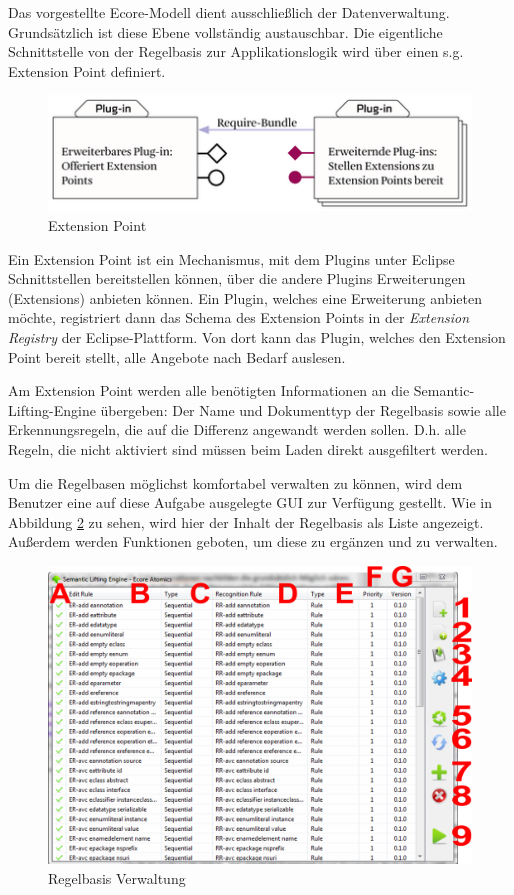 Das vorgestellte Ecore-Modell dient ausschließlich der Datenverwaltung. Grundsätzlich ist diese
Ebene vollständig austauschbar. Die eigentliche Schnittstelle von der Regelbasis zur
Applikationslogik wird über einen s.g. Extension Point definiert.

\begin{figure}[htb]
  \centering \includegraphics[scale=0.8]{images/extension_point.png}
  \caption{Extension Point \cite{ERCP2011}}
  \label{fig:extension_point}
\end{figure}

Ein Extension Point ist ein Mechanismus, mit dem Plugins unter Eclipse Schnittstellen bereitstellen
können, über die andere Plugins Erweiterungen (Extensions) anbieten können. Ein Plugin, welches eine
Erweiterung anbieten möchte, registriert dann das Schema des Extension Points in der
\textit{Extension Registry} der Eclipse-Plattform. Von dort kann das Plugin, welches den Extension
Point bereit stellt, alle Angebote nach Bedarf auslesen. \cite{ERCP2011}

Am Extension Point werden alle benötigten Informationen an die Semantic-Lifting-Engine übergeben:
Der Name und Dokumenttyp der Regelbasis sowie alle Erkennungsregeln, die auf die Differenz angewandt
werden sollen. D.h. alle Regeln, die nicht aktiviert sind müssen beim Laden direkt ausgefiltert
werden.

Um die Regelbasen möglichst komfortabel verwalten zu können, wird dem Benutzer eine auf diese
Aufgabe ausgelegte GUI zur Verfügung gestellt. Wie in Abbildung \ref{fig:rulbase_gui} zu sehen,
wird hier der Inhalt der Regelbasis als Liste angezeigt. Außerdem werden Funktionen geboten, um
diese zu ergänzen und zu verwalten.

\begin{figure}[htb]
  \centering \includegraphics[width=1.0\textwidth]{images/rulebase_manager.png}
  \caption{Regelbasis Verwaltung}
  \label{fig:rulbase_gui}
\end{figure}

